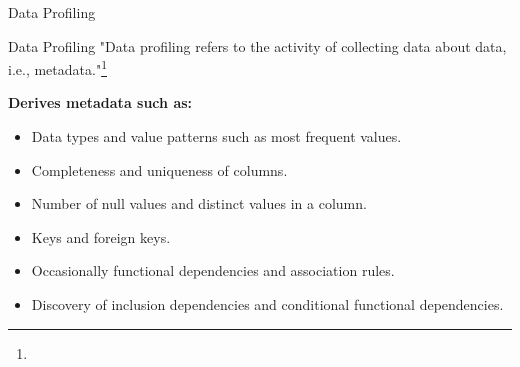 \begin{frame}{Data Profiling}
	\begin{block}{Data Profiling}
		"Data profiling refers to the activity of collecting data about data, i.e., metadata."\footnote{}
	\end{block}

	\textbf{Derives metadata such as:}
	\begin{itemize}
		\item Data types and value patterns such as most frequent values.
		\item Completeness and uniqueness of columns.
		\item Number of null values and distinct values in a column.
		\item Keys and foreign keys.
		\item Occasionally functional dependencies and association rules.
		\item Discovery of inclusion dependencies and conditional functional dependencies.
	\end{itemize}
\end{frame}
